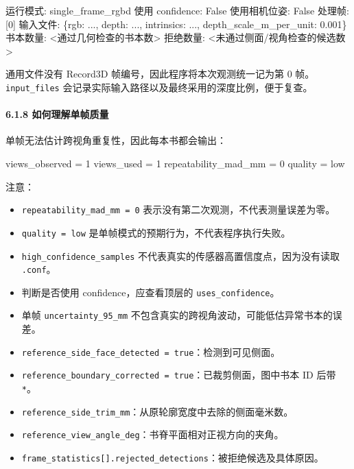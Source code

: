 \documentclass[
  chinese,
  11pt,
  a4paper,
]{article}
\newenvironment{Shaded}{\begin{snugshade}}{\end{snugshade}}
\newcommand{\NormalTok}[1]{#1}
\providecommand{\tightlist}{%
  \setlength{\itemsep}{0pt}\setlength{\parskip}{0pt}}
\begin{document}
\begin{Shaded}
\begin{Highlighting}[]
\NormalTok{运行模式: single\_frame\_rgbd}
\NormalTok{使用 confidence: False}
\NormalTok{使用相机位姿: False}
\NormalTok{处理帧: [0]}
\NormalTok{输入文件: \{\textquotesingle{}rgb\textquotesingle{}: \textquotesingle{}...\textquotesingle{}, \textquotesingle{}depth\textquotesingle{}: \textquotesingle{}...\textquotesingle{}, \textquotesingle{}intrinsics\textquotesingle{}: \textquotesingle{}...\textquotesingle{}, \textquotesingle{}depth\_scale\_m\_per\_unit\textquotesingle{}: 0.001\}}
\NormalTok{书本数量: \textless{}通过几何检查的书本数\textgreater{}}
\NormalTok{拒绝数量: \textless{}未通过侧面/视角检查的候选数\textgreater{}}
\end{Highlighting}
\end{Shaded}

通用文件没有 Record3D 帧编号，因此程序将本次观测统一记为第 0 帧。
\texttt{input\_files}
会记录实际输入路径以及最终采用的深度比例，便于复查。

\paragraph{6.1.8
如何理解单帧质量}\label{618-ux5982ux4f55ux7406ux89e3ux5355ux5e27ux8d28ux91cf}

单帧无法估计跨视角重复性，因此每本书都会输出：

\begin{Shaded}
\begin{Highlighting}[]
\NormalTok{views\_observed = 1}
\NormalTok{views\_used = 1}
\NormalTok{repeatability\_mad\_mm = 0}
\NormalTok{quality = low}
\end{Highlighting}
\end{Shaded}

注意：

\begin{itemize}
\tightlist
\item
  \texttt{repeatability\_mad\_mm\ =\ 0}
  表示没有第二次观测，不代表测量误差为零。
\item
  \texttt{quality\ =\ low} 是单帧模式的预期行为，不代表程序执行失败。
\item
  \texttt{high\_confidence\_samples}
  不代表真实的传感器高置信度点，因为没有读取 \texttt{.conf}。
\item
  判断是否使用 confidence，应查看顶层的 \texttt{uses\_confidence}。
\item
  单帧 \texttt{uncertainty\_95\_mm}
  不包含真实的跨视角波动，可能低估异常书本的误差。
\item
  \texttt{reference\_side\_face\_detected\ =\ true}：检测到可见侧面。
\item
  \texttt{reference\_boundary\_corrected\ =\ true}：已裁剪侧面，图中书本
  ID 后带 \texttt{*}。
\item
  \texttt{reference\_side\_trim\_mm}：从原轮廓宽度中去除的侧面毫米数。
\item
  \texttt{reference\_view\_angle\_deg}：书脊平面相对正视方向的夹角。
\item
  \texttt{frame\_statistics{[}{]}.rejected\_detections}：被拒绝候选及具体原因。
\end{itemize}
\end{document}
